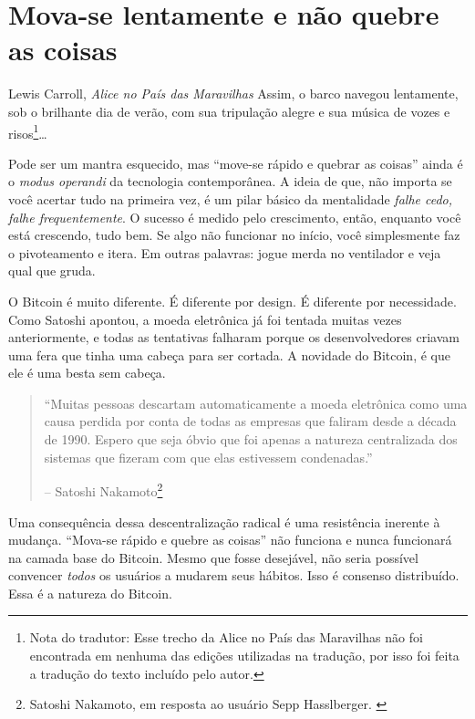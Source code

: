 \chapter{Mova-se lentamente e não quebre as coisas}
\label{les:18}

\begin{chapquote}{Lewis Carroll, \textit{Alice no País das Maravilhas}}
Assim, o barco navegou lentamente, sob o brilhante dia de verão, com sua tripulação alegre e sua música de vozes e risos\footnote{Nota do tradutor: Esse trecho da Alice no País das Maravilhas não foi encontrada em nenhuma das edições utilizadas na tradução, por isso foi feita a tradução do texto incluído pelo autor.}\ldots
\end{chapquote}

Pode ser um mantra esquecido, mas \enquote{move-se rápido e quebrar as coisas} ainda é o \textit{modus operandi} da tecnologia contemporânea. A ideia de que, não importa se você acertar tudo na primeira vez, é um pilar básico da mentalidade \textit{falhe cedo, falhe frequentemente}. O sucesso é medido pelo crescimento, então, enquanto você está crescendo, tudo bem. Se algo não funcionar no início, você simplesmente faz o pivoteamento e itera. Em outras palavras: jogue merda no ventilador e veja qual que gruda.

O Bitcoin é muito diferente. É diferente por design. É diferente por necessidade. Como Satoshi apontou, a moeda eletrônica já foi tentada muitas vezes anteriormente, e todas as tentativas falharam porque os desenvolvedores criavam uma fera que tinha uma cabeça para ser cortada. A novidade do Bitcoin, é que ele é uma besta sem cabeça.

\begin{quotation}\begin{samepage}
\enquote{Muitas pessoas descartam automaticamente a moeda eletrônica como uma causa perdida
por conta de todas as empresas que faliram desde a década de 1990. Espero que seja
óbvio que foi apenas a natureza centralizada dos sistemas que fizeram com que elas estivessem condenadas.}
\begin{flushright} -- Satoshi Nakamoto\footnote{Satoshi Nakamoto, em resposta ao usuário Sepp Hasslberger. \cite{satoshi-centralized-nature}}
\end{flushright}\end{samepage}\end{quotation}

Uma consequência dessa descentralização radical é uma resistência inerente à mudança. \enquote{Mova-se rápido e quebre as coisas} não funciona e nunca funcionará na camada base do Bitcoin. Mesmo que fosse desejável, não seria possível convencer \textit{todos} os usuários a mudarem seus hábitos. Isso é consenso distribuído. Essa é a natureza do Bitcoin.

